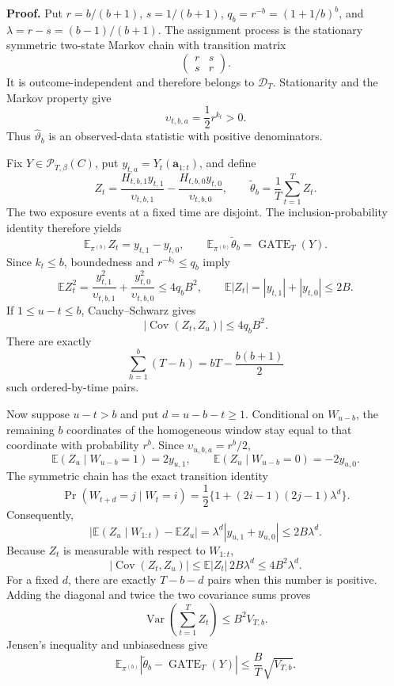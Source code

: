 \textbf{Proof.} Put \(r=b/(b+1)\), \(s=1/(b+1)\), \(q_b=r^{-b}=(1+1/b)^b\), and \(\lambda=r-s=(b-1)/(b+1)\). The assignment process is the stationary symmetric two-state Markov chain with transition matrix
\[
\begin{pmatrix}r&s\\s&r\end{pmatrix}.
\]
It is outcome-independent and therefore belongs to \(\mathcal D_T\). Stationarity and the Markov property give
\[
\upsilon_{t,b,a}=\frac12r^{k_t}>0.
\]
Thus \(\widehat\vartheta_b\) is an observed-data statistic with positive denominators.

Fix \(Y\in\mathcal P_{T,\beta}(C)\), put \(y_{t,a}=Y_t(\mathbf a_{1:t})\), and define
\[
Z_t=\frac{H_{t,b,1}y_{t,1}}{\upsilon_{t,b,1}}-\frac{H_{t,b,0}y_{t,0}}{\upsilon_{t,b,0}},
\qquad
\widetilde\theta_b=\frac1T\sum_{t=1}^T Z_t.
\]
The two exposure events at a fixed time are disjoint. The inclusion-probability identity therefore yields
\[
\mathbb E_{\pi^{(b)}}Z_t=y_{t,1}-y_{t,0},
\qquad
\mathbb E_{\pi^{(b)}}\widetilde\theta_b=\operatorname{GATE}_T(Y).
\]
Since \(k_t\le b\), boundedness and \(r^{-k_t}\le q_b\) imply
\[
\mathbb E Z_t^2
=\frac{y_{t,1}^2}{\upsilon_{t,b,1}}+\frac{y_{t,0}^2}{\upsilon_{t,b,0}}
\le4q_bB^2,
\qquad
\mathbb E|Z_t|=|y_{t,1}|+|y_{t,0}|\le2B.
\]
If \(1\le u-t\le b\), Cauchy--Schwarz gives
\[
|\operatorname{Cov}(Z_t,Z_u)|\le4q_bB^2.
\]
There are exactly
\[
\sum_{h=1}^b(T-h)=bT-\frac{b(b+1)}2
\]
such ordered-by-time pairs.

Now suppose \(u-t>b\) and put \(d=u-b-t\ge1\). Conditional on \(W_{u-b}\), the remaining \(b\) coordinates of the homogeneous window stay equal to that coordinate with probability \(r^b\). Since \(\upsilon_{u,b,a}=r^b/2\),
\[
\mathbb E(Z_u\mid W_{u-b}=1)=2y_{u,1},
\qquad
\mathbb E(Z_u\mid W_{u-b}=0)=-2y_{u,0}.
\]
The symmetric chain has the exact transition identity
\[
\Pr(W_{t+d}=j\mid W_t=i)
=\frac12\{1+(2i-1)(2j-1)\lambda^d\}.
\]
Consequently,
\[
\left|\mathbb E(Z_u\mid W_{1:t})-\mathbb EZ_u\right|
=\lambda^d|y_{u,1}+y_{u,0}|
\le2B\lambda^d.
\]
Because \(Z_t\) is measurable with respect to \(W_{1:t}\),
\[
|\operatorname{Cov}(Z_t,Z_u)|
\le \mathbb E|Z_t|\,2B\lambda^d
\le4B^2\lambda^d.
\]
For a fixed \(d\), there are exactly \(T-b-d\) pairs when this number is positive. Adding the diagonal and twice the two covariance sums proves
\[
\operatorname{Var}\left(\sum_{t=1}^TZ_t\right)\le B^2V_{T,b}.
\]
Jensen's inequality and unbiasedness give
\[
\mathbb E_{\pi^{(b)}}\left|\widetilde\theta_b-\operatorname{GATE}_T(Y)\right|
\le\frac BT\sqrt{V_{T,b}}.
\]

